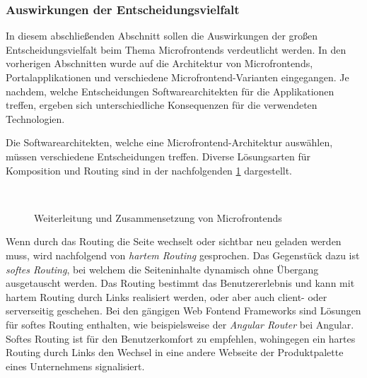 \subsubsection{Auswirkungen der Entscheidungsvielfalt}\label{sec:Entscheidungsvielfalt}

In diesem abschließenden Abschnitt sollen die Auswirkungen der großen Entscheidungsvielfalt beim Thema Microfrontends verdeutlicht werden. In den vorherigen Abschnitten wurde auf die Architektur von Microfrontends, Portalapplikationen und verschiedene Microfrontend-Varianten eingegangen. Je nachdem, welche Entscheidungen Softwarearchitekten für die Applikationen treffen, ergeben sich unterschiedliche Konsequenzen für die verwendeten Technologien.

Die Softwarearchitekten, welche eine Microfrontend-Architektur auswählen, müssen verschiedene Entscheidungen treffen. Diverse Lösungsarten für Komposition und Routing sind in der nachfolgenden \cref{fig:TrennungRoutingStrategien} dargestellt.

\newpage
\begin{figure}[hbt!]
	\centering
	\begin{minipage}[t]{0.8\textwidth}	
		\caption{Weiterleitung und Zusammensetzung von Microfrontends}
		\\ %
		\label{fig:TrennungRoutingStrategien}
	\end{minipage}
\end{figure}

Wenn durch das Routing die Seite wechselt oder sichtbar neu geladen werden muss, wird nachfolgend von \textit{hartem Routing} gesprochen. Das Gegenstück dazu ist \textit{softes Routing}, bei welchem die Seiteninhalte dynamisch ohne Übergang ausgetauscht werden. Das Routing bestimmt das Benutzererlebnis und kann mit hartem Routing durch Links realisiert werden, oder aber auch client- oder serverseitig geschehen. Bei den gängigen Web Fontend Frameworks sind Lösungen für softes Routing enthalten, wie beispielsweise der \textit{Angular Router} bei Angular. Softes Routing ist für den Benutzerkomfort zu empfehlen, wohingegen ein hartes Routing durch Links den Wechsel in eine andere Webseite der Produktpalette eines Unternehmens signalisiert.

